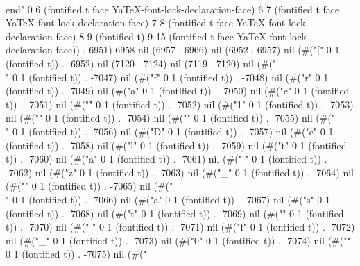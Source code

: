 \\end{}" 0 6 (fontified t face YaTeX-font-lock-declaration-face) 6 7 (fontified t face YaTeX-font-lock-declaration-face) 7 8 (fontified t face YaTeX-font-lock-declaration-face) 8 9 (fontified t) 9 15 (fontified t face YaTeX-font-lock-declaration-face)) . 6951) 6958 nil (6957 . 6966) nil (6952 . 6957) nil (#("[" 0 1 (fontified t)) . -6952) nil (7120 . 7124) nil (7119 . 7120) nil (#("\\" 0 1 (fontified t)) . -7047) nil (#("f" 0 1 (fontified t)) . -7048) nil (#("r" 0 1 (fontified t)) . -7049) nil (#("a" 0 1 (fontified t)) . -7050) nil (#("c" 0 1 (fontified t)) . -7051) nil (#("{" 0 1 (fontified t)) . -7052) nil (#("1" 0 1 (fontified t)) . -7053) nil (#("}" 0 1 (fontified t)) . -7054) nil (#("{" 0 1 (fontified t)) . -7055) nil (#("\\" 0 1 (fontified t)) . -7056) nil (#("D" 0 1 (fontified t)) . -7057) nil (#("e" 0 1 (fontified t)) . -7058) nil (#("l" 0 1 (fontified t)) . -7059) nil (#("t" 0 1 (fontified t)) . -7060) nil (#("a" 0 1 (fontified t)) . -7061) nil (#(" " 0 1 (fontified t)) . -7062) nil (#("z" 0 1 (fontified t)) . -7063) nil (#("_" 0 1 (fontified t)) . -7064) nil (#("{" 0 1 (fontified t)) . -7065) nil (#("\\" 0 1 (fontified t)) . -7066) nil (#("a" 0 1 (fontified t)) . -7067) nil (#("s" 0 1 (fontified t)) . -7068) nil (#("t" 0 1 (fontified t)) . -7069) nil (#("}" 0 1 (fontified t)) . -7070) nil (#(" " 0 1 (fontified t)) . -7071) nil (#("f" 0 1 (fontified t)) . -7072) nil (#("_" 0 1 (fontified t)) . -7073) nil (#("0" 0 1 (fontified t)) . -7074) nil (#("}" 0 1 (fontified t)) . -7075) nil (#("

